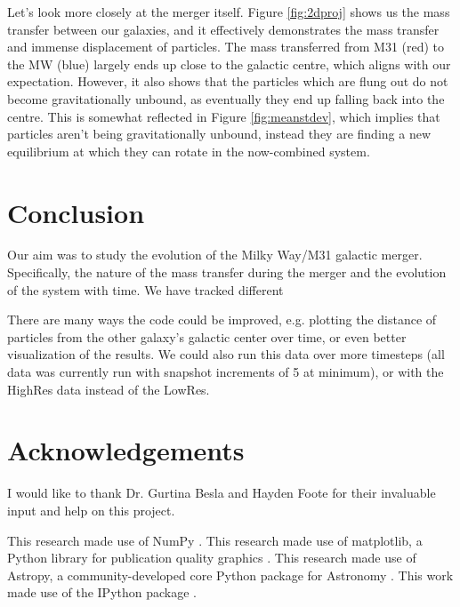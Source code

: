 \documentclass[linenumbers]{aastex631} %
\begin{document}
Let's look more closely at the merger itself. Figure \ref{fig:2dproj}
shows us the mass transfer between our galaxies, and it effectively demonstrates the mass transfer and immense displacement of particles. The mass transferred from M31 (red) to the MW (blue) largely ends up close to the galactic centre, which aligns with our expectation. However, it also shows that the particles which are flung out do not become gravitationally unbound, as eventually they end up falling back into the centre. This is somewhat reflected in Figure \ref{fig:meanstdev}, which implies that particles aren't being gravitationally unbound, instead they are finding a new equilibrium at which they can rotate in the now-combined system.


\section{Conclusion}

Our aim was to study the evolution of the Milky Way/M31 galactic merger. Specifically, the nature of the mass transfer during the merger and the evolution of the system with time. We have tracked different 



There are many ways the code could be improved, e.g. plotting the distance of particles from the other galaxy's galactic center over time, or even better visualization of the results. We could also run this data over more timesteps (all data was currently run with snapshot increments of 5 at minimum), or with the HighRes data instead of the LowRes.

\section{Acknowledgements}
I would like to thank Dr. Gurtina Besla and Hayden Foote for their invaluable input and help on this project.

This research made use of NumPy \citep{harris2020array}. This research made use of matplotlib, a Python library for publication quality graphics \citep{Hunter:2007}. This research made use of Astropy, a community-developed core Python package for Astronomy \citep{2018AJ....156..123A, 2013A&A...558A..33A}. This work made use of the IPython package \citep{PER-GRA:2007}.

{}

\end{document}
